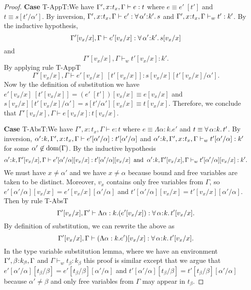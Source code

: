 \documentclass[11pt]{article}
\newcommand{\al}{\alpha}
\newcommand{\bind}{\hspace{0.05em}{:}\hspace{0.05em}} %
\newcommand{\polytype}[3]{\forall\, #1\bind #2.\, #3}
\newcommand{\dom}[1]{{\rm dom}(#1)}
\begin{document}
\begin{proof}
{\bf Case} {\sc T-AppT}:We have $\Gamma', x\bind t_x,\Gamma \vdash e : t$ where $e \equiv e'\; [t']$ and $t \equiv s[t'/\al']$. 
By inversion, $\Gamma', x\bind t_x, \Gamma \vdash e' : \polytype{\al'}{k'}{s}$ and $\Gamma', x\bind t_x, \Gamma \vdash_w t' : k'$. By the inductive hypothesis,
\begin{equation}\label{361T}
\Gamma'[v_x/x],\Gamma\vdash e'[v_x/x] : \polytype{\al'}{k'}{s[v_x/x]}
\end{equation}
and
\begin{equation}\label{362T}
\Gamma'[v_x/x],\Gamma\vdash_w t'[v_x/x] : k'.
\end{equation}
By applying rule {\sc T-AppT}
\begin{equation}
\Gamma'[v_x/x],\Gamma\vdash e'[v_x/x]\;[t'[v_x/x]] : s[v_x/x][t'[v_x/x]/\al'].
\end{equation}
Now by the definition of substitution we have $e'[v_x/x]\; [t'[v_x/x]] = (e'\;[t'])[v_x/x] \equiv e[v_x/x]$ and $s[v_x/x][t'[v_x/x]/\al'] = s[t'/\al'][v_x/x] \equiv t[v_x/x]$. Therefore, we conclude that $\Gamma'[v_x/x],\Gamma \vdash e[v_x/x] : t[v_x/x]$.

{\bf Case} {\sc T-AbsT}:We have $\Gamma', x:t_x,\Gamma \vdash e : t$ where $e \equiv \Lambda \al:k. e'$ and $t \equiv \polytype{\al}{k}{t'}$. By inversion, $\al'\bind k, \Gamma', x\bind t_x,\Gamma \vdash e'[\al'/\al] : t'[\al'/\al]$ and $\al'\bind k, \Gamma', x\bind t_x,\Gamma \vdash_w t'[\al'/\al] : k'$ for some $\al'\not\in\dom{\Gamma}$. By the inductive hypothesis
\begin{equation}
\al'\bind k, \Gamma'[v_x/x],\Gamma \vdash e'[\al'/\al][v_x/x] : t'[\al'/\al][v_x/x] \;\;{\rm and}\;\; \al'\bind k, \Gamma'[v_x/x],\Gamma \vdash_w t'[\al'/\al][v_x/x] : k'.
\end{equation}
We must have $x\neq \al'$ and we have $x \neq \al$ because bound and free variables are taken to be distinct. Moreover, $v_x$ contains only free variables from $\Gamma$, so $e'[\al'/\al][v_x/x] = e'[v_x/x][\al'/\al]$ and $t'[\al'/\al][v_x/x] = t'[v_x/x][\al'/\al]$. Then by rule {\sc T-AbsT}
\begin{equation}
\Gamma'[v_x/x], \Gamma' \vdash \Lambda \al:k.(e'[v_x/x]) : \polytype{\al}{k}{t'[v_x/x]}.
\end{equation}
By definition of substitution, we can rewrite the above as
\[
\Gamma'[v_x/x],\Gamma \vdash (\Lambda \al:k.e')[v_x/x] : \polytype{\al}{k}{t'}[v_x/x].
\]
In the type variable substitution lemma, where we have an environment $\Gamma',\beta\bind k_\beta,\Gamma$ and $\Gamma \vdash_w t_\beta : k_\beta$ this proof is similar except that we argue that $e'[\al'/\al][t_\beta/\beta] = e'[t_\beta/\beta][\al'/\al]$ and $t'[\al'/\al][t_\beta/\beta] = t'[t_\beta/\beta][\al'/\al]$ because $\al'\neq\beta$ and only free variables from $\Gamma$ may appear in $t_\beta$.


\end{proof}
\end{document}
